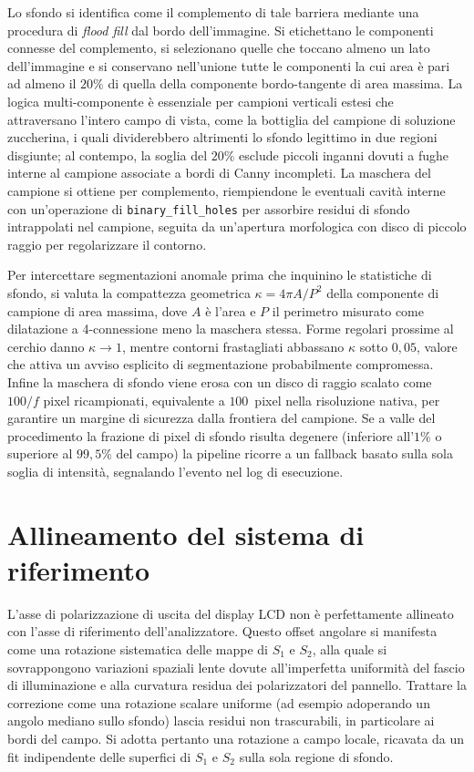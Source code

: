 Lo sfondo si identifica come il complemento di tale barriera mediante una procedura di \emph{flood fill} dal bordo dell'immagine. Si etichettano le componenti connesse del complemento, si selezionano quelle che toccano almeno un lato dell'immagine e si conservano nell'unione tutte le componenti la cui area è pari ad almeno il $20\%$ di quella della componente bordo-tangente di area massima. La logica multi-componente è essenziale per campioni verticali estesi che attraversano l'intero campo di vista, come la bottiglia del campione di soluzione zuccherina, i quali dividerebbero altrimenti lo sfondo legittimo in due regioni disgiunte; al contempo, la soglia del $20\%$ esclude piccoli inganni dovuti a fughe interne al campione associate a bordi di Canny incompleti. La maschera del campione si ottiene per complemento, riempiendone le eventuali cavità interne con un'operazione di \texttt{binary\_fill\_holes} per assorbire residui di sfondo intrappolati nel campione, seguita da un'apertura morfologica con disco di piccolo raggio per regolarizzare il contorno.

Per intercettare segmentazioni anomale prima che inquinino le statistiche di sfondo, si valuta la compattezza geometrica $\kappa = 4\pi A / P^2$ della componente di campione di area massima, dove $A$ è l'area e $P$ il perimetro misurato come dilatazione a 4-connessione meno la maschera stessa. Forme regolari prossime al cerchio danno $\kappa \to 1$, mentre contorni frastagliati abbassano $\kappa$ sotto $0{,}05$, valore che attiva un avviso esplicito di segmentazione probabilmente compromessa. Infine la maschera di sfondo viene erosa con un disco di raggio scalato come $100/f$ pixel ricampionati, equivalente a $100$~pixel nella risoluzione nativa, per garantire un margine di sicurezza dalla frontiera del campione. Se a valle del procedimento la frazione di pixel di sfondo risulta degenere (inferiore all'$1\%$ o superiore al $99{,}5\%$ del campo) la pipeline ricorre a un fallback basato sulla sola soglia di intensità, segnalando l'evento nel log di esecuzione.

\section{Allineamento del sistema di riferimento}
\label{sec:allineamento}

L'asse di polarizzazione di uscita del display LCD non è perfettamente allineato con l'asse di riferimento dell'analizzatore. Questo offset angolare si manifesta come una rotazione sistematica delle mappe di $S_1$ e $S_2$, alla quale si sovrappongono variazioni spaziali lente dovute all'imperfetta uniformità del fascio di illuminazione e alla curvatura residua dei polarizzatori del pannello. Trattare la correzione come una rotazione scalare uniforme (ad esempio adoperando un angolo mediano sullo sfondo) lascia residui non trascurabili, in particolare ai bordi del campo. Si adotta pertanto una rotazione a campo locale, ricavata da un fit indipendente delle superfici di $S_1$ e $S_2$ sulla sola regione di sfondo.

